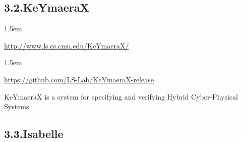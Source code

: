 \documentclass[12pt,twoside]{article}
\begin{document}
\subsection{3.2.\hspace*{0.5em}KeYmaeraX}\label{sec-keymaerax}%

\begin{mddefinitions}%


\begin{mdbmarginx}{}{}{}{1.5em}%
\begin{mddefdata}%
\href{http://www.ls.cs.cmu.edu/KeYmaeraX/}{{\ttfamily http://\hspace{0pt}www.\hspace{0pt}ls.\hspace{0pt}cs.\hspace{0pt}cmu.\hspace{0pt}edu/\hspace{0pt}KeYmaeraX/\hspace{0pt}}}
\end{mddefdata}%
\end{mdbmarginx}%


\begin{mdbmarginx}{}{}{}{1.5em}%
\begin{mddefdata}%
\href{https://github.com/LS-Lab/KeYmaeraX-release}{{\ttfamily https://\hspace{0pt}github.\hspace{0pt}com/\hspace{0pt}LS-\hspace{0pt}Lab/\hspace{0pt}KeYmaeraX-\hspace{0pt}release}}%
\end{mddefdata}%
\end{mdbmarginx}%
\end{mddefinitions}%

\noindent{}KeYmaeraX is a system for specifying and verifying Hybrid
Cyber-Physical Systems.%

\subsection{3.3.\hspace*{0.5em}Isabelle}\label{sec-isabelle}%
\end{document}
